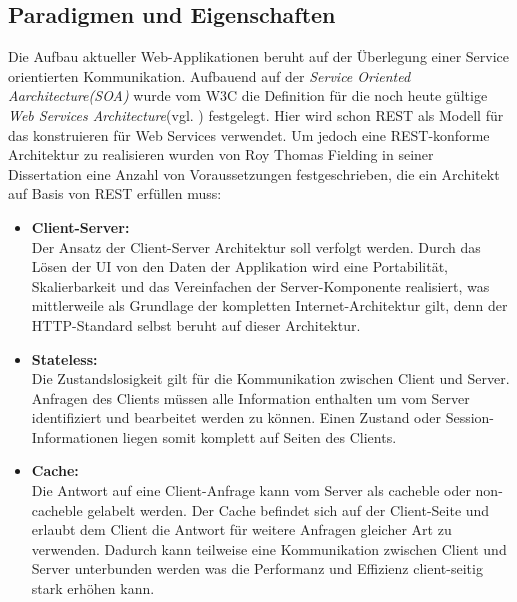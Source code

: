 \documentclass[fleqn,10pt,ngerman]{SelfArx}
\begin{document}
\subsection{Paradigmen und Eigenschaften}
Die Aufbau aktueller Web-Applikationen beruht auf der Überlegung einer Service orientierten Kommunikation. Aufbauend auf der \textit{Service Oriented Aarchitecture(SOA)} wurde vom W3C die Definition für die noch heute gültige \textit{Web Services Architecture}(vgl. \cite{WSA}) festgelegt. Hier wird schon REST als Modell für das konstruieren für Web Services verwendet. Um jedoch eine REST-konforme Architektur zu realisieren wurden von Roy Thomas Fielding in seiner Dissertation\cite{Fielding:2000} eine Anzahl von Voraussetzungen festgeschrieben, die ein Architekt auf Basis von REST erfüllen muss:

\begin{itemize}
	\item \textbf{Client-Server:}\\ Der Ansatz der Client-Server Architektur soll verfolgt werden. Durch das Lösen der UI von den Daten der Applikation wird eine Portabilität, Skalierbarkeit und das Vereinfachen der Server-Komponente realisiert, was mittlerweile als Grundlage der kompletten Internet-Architektur gilt, denn der HTTP-Standard selbst beruht auf dieser Architektur.
	\item \textbf{Stateless:}\\ Die Zustandslosigkeit gilt für die Kommunikation zwischen Client und Server. Anfragen des Clients müssen alle Information enthalten um vom Server identifiziert und bearbeitet werden zu können. Einen Zustand oder Session-Informationen liegen somit komplett auf Seiten des Clients.
	\item \textbf{Cache:}\\ Die Antwort auf eine Client-Anfrage kann vom Server als cacheble oder non-cacheble gelabelt werden. Der Cache befindet sich auf der Client-Seite und erlaubt dem Client die Antwort für weitere Anfragen gleicher Art zu verwenden. Dadurch kann teilweise eine Kommunikation zwischen Client und Server unterbunden werden was die Performanz und Effizienz client-seitig stark erhöhen kann.

\end{itemize}
\end{document}
